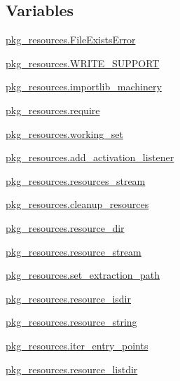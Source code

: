 \subsection*{Variables}
\begin{DoxyCompactItemize}
\item 
\hyperlink{namespacepkg__resources_a2ca0a416c35ea75d36921d810969e04e}{pkg\+\_\+resources.\+File\+Exists\+Error}
\item 
\hyperlink{namespacepkg__resources_a8cba25e3f73d53602d7f99bdba45d768}{pkg\+\_\+resources.\+W\+R\+I\+T\+E\+\_\+\+S\+U\+P\+P\+O\+RT}
\item 
\hyperlink{namespacepkg__resources_a66b38c27156e4bfec03efd41393cdbe1}{pkg\+\_\+resources.\+importlib\+\_\+machinery}
\item 
\hyperlink{namespacepkg__resources_a4b0ffc0687f16fe370416cea417a456f}{pkg\+\_\+resources.\+require}
\item 
\hyperlink{namespacepkg__resources_a5eecf7277dc4e63e653bfa39a805e4d2}{pkg\+\_\+resources.\+working\+\_\+set}
\item 
\hyperlink{namespacepkg__resources_a4a44c235f589f75c875c7f50d393214c}{pkg\+\_\+resources.\+add\+\_\+activation\+\_\+listener}
\item 
\hyperlink{namespacepkg__resources_aa5150f8a5dc0c8a25647e076b7ea642c}{pkg\+\_\+resources.\+resources\+\_\+stream}
\item 
\hyperlink{namespacepkg__resources_a095e28834fa3aa947015d2741c5582c0}{pkg\+\_\+resources.\+cleanup\+\_\+resources}
\item 
\hyperlink{namespacepkg__resources_aecfd8f199411bf803635a831918594bb}{pkg\+\_\+resources.\+resource\+\_\+dir}
\item 
\hyperlink{namespacepkg__resources_a118f064bfa3877be4193e9625ce77860}{pkg\+\_\+resources.\+resource\+\_\+stream}
\item 
\hyperlink{namespacepkg__resources_a2f0d36a78ded6f3d29365c541464f923}{pkg\+\_\+resources.\+set\+\_\+extraction\+\_\+path}
\item 
\hyperlink{namespacepkg__resources_a0580c0fcb1ada90918f5e9affeb2dc8f}{pkg\+\_\+resources.\+resource\+\_\+isdir}
\item 
\hyperlink{namespacepkg__resources_a929d3bc500116a3cacb30f0fb11c2f46}{pkg\+\_\+resources.\+resource\+\_\+string}
\item 
\hyperlink{namespacepkg__resources_a0003897e2044a6bedb14a89ad7cc5ce9}{pkg\+\_\+resources.\+iter\+\_\+entry\+\_\+points}
\item 
\hyperlink{namespacepkg__resources_a2d9efe1bc722649989e4fd568f646418}{pkg\+\_\+resources.\+resource\+\_\+listdir}

\end{DoxyCompactItemize}
